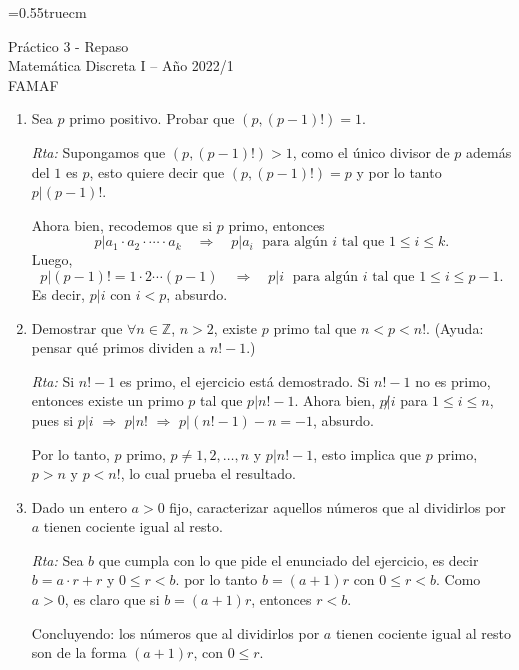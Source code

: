 \documentclass[a4paper,12pt,twoside,spanish,reqno]{amsbook}
\numberwithin{equation}{section}
\newcommand{\rta}{\noindent\textit{Rta: }}
\begin{document}
    \baselineskip=0.55truecm %

{\bf \begin{center} Práctico 3 - Repaso \\ Matemática Discreta I -- Año 2022/1 \\ FAMAF\end{center}}




\begin{enumerate}
\setlength\itemsep{1.1em}

\item Sea $p$ primo positivo. Probar que $(p,(p-1)!)=1$.

\rta Supongamos que  $(p,(p-1)!)>1$,  como el único divisor de $p$ además del $1$ es $p$, esto quiere decir que  $(p,(p-1)!)=p$ y por lo tanto $p|(p-1)!$.

Ahora bien, recodemos que si  $p$ primo, entonces
$$
p | a_1\cdot a_2 \cdot \cdots \cdot a_k \quad \Rightarrow\quad p| a_i \; \text{ para algún $i$ tal que $1 \le i \le k$}.
$$
Luego,
$$
p | (p-1)! = 1\cdot 2 \cdots (p-1) \quad \Rightarrow\quad p| i \; \text{ para algún $i$ tal que $1 \le i \le p-1$}.
$$
Es decir, $p|i$ con $i < p$, absurdo.


\item Demostrar que $\forall n\in{\mathbb Z}$, $n>2$, existe $p$ primo tal que $n<p<n!$. (Ayuda: pensar qué primos dividen a $n! - 1$.)

\rta Si $n! - 1$ es primo,  el ejercicio está demostrado. Si  $n! - 1$ no es primo, entonces existe un primo $p$ tal que $p| n! - 1$. Ahora bien, $p\not| i$ para $1 \le i \le n$, pues si $p|i$ $\Rightarrow$    $p| n!$  $\Rightarrow$  $p| (n! - 1) -n = -1$,  absurdo. 

Por lo tanto, $p$ primo, $p \ne 1,2, \ldots, n$ y  $p| n! - 1$,  esto implica que $p$ primo, $p > n$ y  $p <  n!$, lo cual prueba el resultado.



\item Dado un entero $a>0$ fijo, caracterizar aquellos números que al dividirlos por $a$ tienen cociente igual al resto.

\rta Sea $b$ que cumpla con lo que pide el enunciado del ejercicio, es decir $b = a \cdot r + r$ y $0 \le r < b$. por lo tanto  $b = (a+1) r$ con  $0 \le r < b$. Como $a>0$,  es claro que si $b=(a+1)r$,  entonces $r < b$. 

Concluyendo:  los  números que al dividirlos por $a$ tienen cociente igual al resto son de la forma $(a+1)r$,  con $0 \le r$. 



\end{enumerate}
\end{document}
